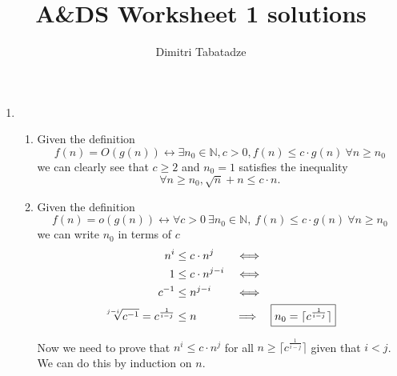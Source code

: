 \documentclass{article}
\title{A\&DS Worksheet 1 solutions}
\author{Dimitri Tabatadze}
\begin{document}
    \maketitle

    \begin{enumerate}
        \item \begin{enumerate}[label={(\arabic*)}]
            \item {
                Given the definition 
                \begin{displaymath}
                    f(n) = O(g(n)) \leftrightarrow \exists n_0 \in \mathbb{N}, c > 0, f(n) \leq c \cdot g(n) \ \forall n \geq n_0
                \end{displaymath}
                we can clearly see that \(c \geq 2\) and \(n_0 = 1\) satisfies the inequality
                \begin{displaymath}
                    \forall n \geq n_0, \sqrt{n} + n \leq c \cdot n.
                \end{displaymath}
            }
            \item {
                Given the definition
                \begin{displaymath}
                    f(n) = o(g(n)) \leftrightarrow \forall c > 0 \ \exists n_0 \in \mathbb{N} ,\ f(n) \leq c \cdot g(n) \ \forall n \geq n_0
                \end{displaymath}
                we can write \(n_0\) in terms of \(c\)
                \begin{displaymath}
                    \begin{aligned}
                        n^i &\leq c \cdot n^j & \Longleftrightarrow & \\
                        1 &\leq c \cdot n^{j - i} & \Longleftrightarrow & \\
                        c^{-1} &\leq n^{j - i} & \Longleftrightarrow & \\
                        \sqrt[j - i]{c^{-1}} = c^{\frac{1}{i - j}} &\leq n & \implies & 
                        \Aboxed{n_0 &= \lceil c^{\frac{1}{i - j}} \rceil}
                    \end{aligned}
                \end{displaymath}

                Now we need to prove that \(n^i \leq c \cdot n^j \) for all \(n \geq \lceil c^{\frac{1}{i - j}} \rceil\) given that \(i < j\). We can do this by induction on \(n\).

}
\end{enumerate}
\end{enumerate}
\end{document}
